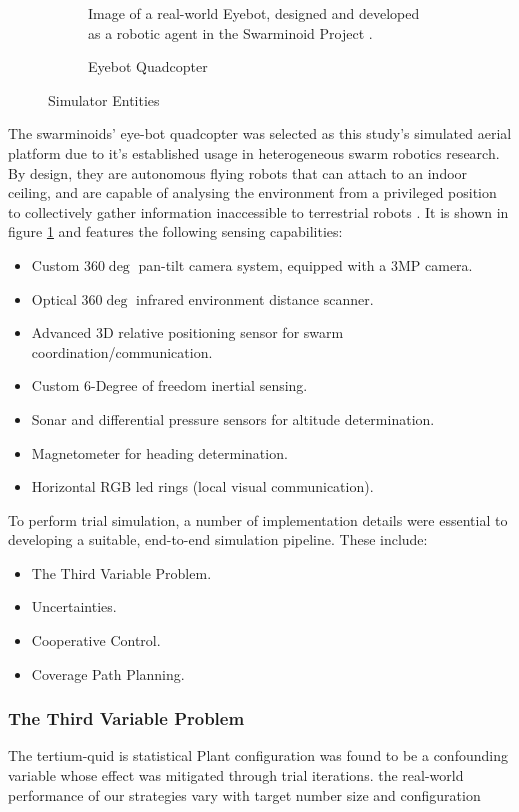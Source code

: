 \documentclass{report}
\begin{document}
\begin{figure}
\begin{subfigure}[b]{0.4\textwidth}
		\caption{Eyebot Quadcopter}
		\label{fig:eyebot_hardware}
		{Image of a real-world Eyebot, designed and developed as a robotic agent in the Swarminoid Project \cite{Dorigo2013}}.
	\end{subfigure}
	\caption{Simulator Entities}
	\label{fig:sim_orig}
\end{figure}

The swarminoids' \cite{Dorigo2013} eye-bot quadcopter was selected as this study's simulated aerial platform due to it's established usage in heterogeneous swarm robotics research. By design, they are autonomous flying robots that can attach to an indoor ceiling, and are capable of analysing the environment from a privileged position to collectively gather information inaccessible to terrestrial robots \cite{Dorigo2013}. It is shown in figure \ref{fig:eyebot_hardware} and features the following sensing capabilities:
\begin{itemize}
    \item Custom $360\deg$ pan-tilt camera system, equipped with a 3MP camera.
    \item Optical $360\deg$ infrared environment distance scanner.
    \item Advanced 3D relative positioning sensor for swarm coordination/communication.
    \item Custom 6-Degree of freedom inertial sensing.
    \item Sonar and differential pressure sensors for altitude determination.
    \item Magnetometer for heading determination.
    \item Horizontal RGB led rings (local visual communication).
\end{itemize}

To perform trial simulation, a number of implementation details were essential to developing a suitable, end-to-end simulation pipeline. These include:
\begin{itemize}
	\item The Third Variable Problem.
	\item Uncertainties.
	\item Cooperative Control.
	\item Coverage Path Planning.
\end{itemize}

\subsubsection{The Third Variable Problem}
The tertium-quid is statistical Plant configuration was found to be a confounding variable whose effect was mitigated through trial iterations.
the real-world performance of our strategies vary with target number size and configuration 
\end{document}

